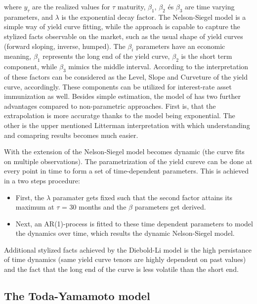 \documentclass[12pt,bibliography=totoc]{article}
\begin{document}
where $y_{\tau}$ are the realized values for $\tau$ maturity, $\beta_{1}$, $\beta_{2}$ és $\beta_{3}$ are time varying parameters, and $\lambda$ is the exponential decay factor.
The Nelson-Siegel model is a simple way of yield curve fitting, while the approach is capable to capture the stylized facts observable on the market, such as the usual shape of yield curves (forward sloping, inverse, humped).
The $\beta_{i}$ parameters have an economic meaning, $\beta_{1}$ represents the long end of the yield curve,  $\beta_{2}$ is the short term component, while $\beta_{3}$ mimics the middle interval. According to the interpretation of \cite{litterman1991common} these factors can be considered as the Level, Slope and Curveture of the yield curve, accordingly. These components can be utilized for interest-rate asset immunization as well. Besides simple estimation, the model of \cite{diebold2006forecasting} has two further advantages compared to non-parametric approaches. First is, that the extrapolation is more accuratge thanks to the model being exponential. The other is the upper mentioned Litterman interpretation with which understanding and comapring results becomes much easier.
 
With the extension of \cite{diebold2006forecasting} the Nelson-Siegel model becomes dynamic (the curve fits on multiple observations). The parametrization of the yield cureve can be done at every point in time
to form a set of time-dependent parameters. This is achieved in a two steps procedure:
\begin{itemize}
\item First, the $\lambda$  paramater gets fixed such that the second factor attains its maximum at $\tau$ = 30 months and the $\beta$ parameters get derived.
\item Next, an AR(1)-process is fitted to these time dependent parameters to model the dynamics over time, which results the dynamic Nelson-Siegel model.
\end{itemize}

Additional stylized facts achieved by the Diebold-Li model is the high persistance of time dynamics (same yield curve tenors are highly dependent on past values) and the fact that the long end of the curve is less volatile than the short end.


\subsection{The Toda-Yamamoto model}
\end{document}
